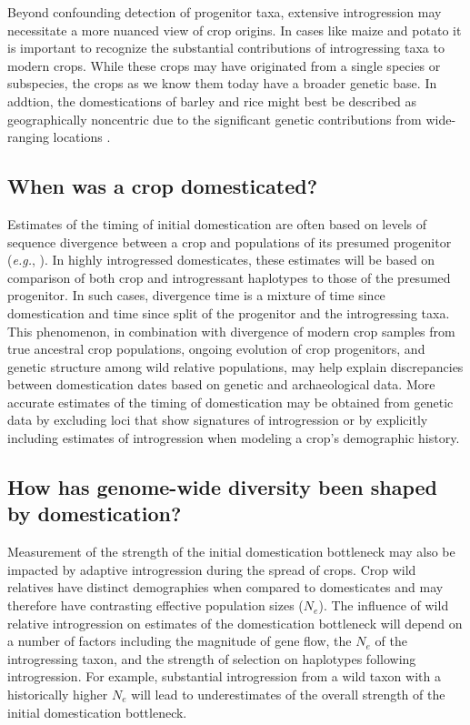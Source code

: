 \documentclass[11pt]{article}
\begin{document}
Beyond confounding detection of progenitor taxa, extensive introgression may necessitate a more nuanced view of crop origins.
In cases like maize and potato it is important to recognize the substantial contributions of introgressing taxa to modern crops.
While these crops may have originated from a single species or subspecies, the crops as we know them today have a broader genetic base.
In addtion, the domestications of barley and rice might best be described as geographically noncentric due to the significant genetic contributions from wide-ranging locations \cite{allaby2015barley}.

\subsection*{When was a crop domesticated?}
Estimates of the timing of initial domestication are often based on levels of sequence divergence between a crop and populations of its presumed progenitor (\emph{e.g.}, \citep{matsuoka2002single, molina2011molecular}).
In highly introgressed domesticates, these estimates will be based on comparison of both crop and introgressant haplotypes to those of the presumed progenitor.
In such cases, divergence time is a mixture of time since domestication and time since split of the progenitor and the introgressing taxa.
This phenomenon, in combination with divergence of modern crop samples from true ancestral crop populations, ongoing evolution of crop progenitors, and genetic structure among wild relative populations, may help explain discrepancies between domestication dates based on genetic and archaeological data.
More accurate estimates of the timing of domestication may be obtained from genetic data by excluding loci that show signatures of introgression or by explicitly including estimates of introgression when modeling a crop's demographic history.

\subsection*{How has genome-wide diversity been shaped by domestication?}

Measurement of the strength of the initial domestication bottleneck may also be impacted by adaptive introgression during the spread of crops.
Crop wild relatives have distinct demographies when compared to domesticates and may therefore have contrasting effective population sizes ($N_e$).
The influence of wild relative introgression on estimates of the domestication bottleneck will depend on a number of factors including the magnitude of gene flow, the $N_e$ of the introgressing taxon, and the strength of selection on haplotypes following introgression.
For example, substantial introgression from a wild taxon with a historically higher $N_e$ will lead to underestimates of the overall strength of the initial domestication bottleneck.
\end{document}
